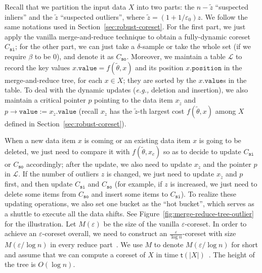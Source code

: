 \begin{figure}[ht]
	\caption{}
\end{figure}

Recall that we partition the input data $X$ into two parts: the $n-\tilde{z}$ ``suspected inliers'' and the $\tilde{z}$ ``suspected outliers'', where $\tilde{z}=(1+1/\varepsilon_0)z$. We follow the same notations used in Section~\ref{sec:robust-coreset}. For the first part, we just apply the vanilla merge-and-reduce technique to obtain a fully-dynamic coreset $C_{\mathtt{si}}$; for the other part, we can just take a $\delta$-sample or take the whole set (if we require $\beta$ to be $0$), and denote it as $C_{\mathtt{so}}$. Moreover, we maintain a table $\mathscr{L}$ to record the key values $ x.\mathtt{value}= f(\tilde{\theta},x)$ and its position $ x.\mathtt{position} $ in the merge-and-reduce tree, for each $x\in X$; they are sorted by the $x.\mathtt{value}$s in the table. To deal with the dynamic updates ({\em e.g.,} deletion and insertion), we also maintain a critical pointer $ p $ pointing to the data item $ x_{\tilde{z}} $ and $p\rightarrow \mathtt{value}:=x_{\tilde{z}}.\mathtt{value} $  (recall $x_{\tilde{z}}$ has the $ \tilde{z}$-th largest cost $ f(\tilde{\theta},x) $ among $X$ defined in Section~\ref{sec:robust-coreset}). 

When a new data item $x$ is coming or an existing data item $x$ is going to be deleted, we just need to compare it with $ f(\tilde{\theta},x_c) $ so as to decide to update $C_{\mathtt{si}}$ or $C_{\mathtt{so}}$ accordingly; after the update, we also need to update $ x_{\tilde{z}} $ and the pointer $p$ in $\mathscr{L}$. If the number of outliers $z$ is changed, we just need to update $ x_{\tilde{z}} $ and  $p$ first, and then update $C_{\mathtt{si}}$ and $C_{\mathtt{so}}$ (for example, if $z$ is increased, we just need to delete some items from $C_{\mathtt{so}}$ and insert some items to $C_{\mathtt{si}}$). To realize these updating operations, we also set one bucket as the ``hot bucket'', which serves as a shuttle to execute all the data shifts. See Figure~\ref{fig:merge-reduce-tree-outlier} for the illustration. Let $ M(\varepsilon) $ be the size of the vanilla $\varepsilon$-coreset. In order to achieve an $ \varepsilon $-coreset overall, we need to construct an $ \frac{\varepsilon}{\log n} $-coreset with size $ M(\varepsilon/\log n) $ in every reduce part~\cite{AgarwalHV04}. We use $ M $ to denote $ M(\varepsilon/\log n) $ for short and assume that we can compute a coreset of $ X $ in time $ \mathsf{t}(|X|) $~\cite{DBLP:books/daglib/0035668}. The height of the tree is $ O(\log n) $. 

